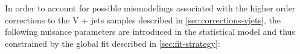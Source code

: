 In order to account for possible mismodelings associated with the higher order
corrections to the V + jets samples described in \cref{sec:corrections-vjets},
the following nuisance parameters are introduced in the statistical model and
thus constrained by the global fit described in \cref{sec:fit-strategy}:
